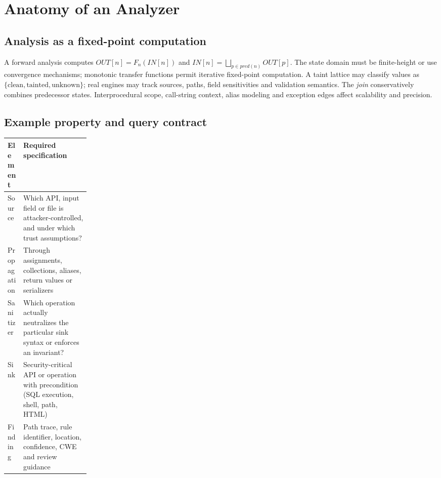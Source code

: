 \documentclass[10pt,letterpaper]{article}
\begin{document}
\section{Anatomy of an Analyzer}
\begin{center}
\end{center}
\subsection{Analysis as a fixed-point computation}
A forward analysis computes \(OUT[n]=F_n(IN[n])\) and \(IN[n]=\bigsqcup_{p\in pred(n)} OUT[p]\). The state domain must be finite-height or use convergence mechanisms; monotonic transfer functions permit iterative fixed-point computation. A taint lattice may classify values as \(\{\mathrm{clean},\mathrm{tainted},\mathrm{unknown}\}\); real engines may track sources, paths, field sensitivities and validation semantics. The \emph{join} conservatively combines predecessor states. Interprocedural scope, call-string context, alias modeling and exception edges affect scalability and precision.
\subsection{Example property and query contract}
\begin{tabularx}{\linewidth}{@{}p{0.19\linewidth}Y@{}}\toprule
Element & Required specification\\\midrule
Source & Which API, input field or file is attacker-controlled, and under which trust assumptions?\\
Propagation & Through assignments, collections, aliases, return values or serializers\\
Sanitizer & Which operation actually neutralizes the particular sink syntax or enforces an invariant?\\
Sink & Security-critical API or operation with precondition (SQL execution, shell, path, HTML)\\
Finding & Path trace, rule identifier, location, confidence, CWE and review guidance\\\bottomrule
\end{tabularx}
\end{document}
